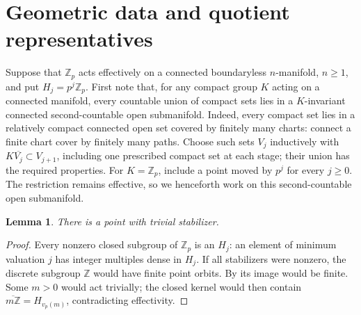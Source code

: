 \documentclass[11pt]{amsart}
\numberwithin{equation}{section}
\newtheorem{lemma}[lemma]{Lemma}
\theoremstyle{definition}
\theoremstyle{remark}
\newcommand{\Z}{\mathbb Z}
\newcommand{\Zp}{\mathbb Z_p}
\begin{document}
\section{Geometric data and quotient representatives}\label{geo:fixed-data}

Suppose that $\Zp$ acts effectively on a connected boundaryless
$n$-manifold, $n\ge1$, and put $H_j=p^j\Zp$.
First note that, for any compact group $K$ acting on a connected manifold,
every countable union of compact sets lies in a $K$-invariant connected
second-countable open submanifold. Indeed, every compact set lies in a
relatively compact connected open set covered by finitely many charts:
connect a finite chart cover by finitely many paths. Choose such sets
$V_j$ inductively with $K\overline{V_j}\subset V_{j+1}$, including one
prescribed compact set at each stage; their union has the required
properties. For $K=\Zp$, include a point moved by $p^j$ for every $j\ge0$.
The restriction remains effective, so we henceforth work on this
second-countable open submanifold.

\begin{lemma}\label{geo:free-point}
There is a point with trivial stabilizer.
\end{lemma}
\begin{proof}
Every nonzero closed subgroup of $\Zp$ is an $H_j$: an element of
minimum valuation $j$ has integer multiples dense in $H_j$. If all stabilizers
were nonzero, the discrete subgroup $\Z$ would have finite point orbits.
By \cite[Theorem 2]{Rob75} its image would be finite. Some $m>0$ would
act trivially; the closed kernel would then contain
$\overline{m\Z}=H_{v_p(m)}$, contradicting effectivity.
\end{proof}
\end{document}
